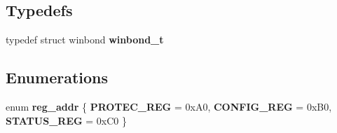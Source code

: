\subsection*{Typedefs}
\begin{DoxyCompactItemize}
\item 
typedef struct winbond \textbf{ winbond\+\_\+t}
\end{DoxyCompactItemize}
\subsection*{Enumerations}
\begin{DoxyCompactItemize}
\item 
enum \textbf{ reg\+\_\+addr} \{ \textbf{ P\+R\+O\+T\+E\+C\+\_\+\+R\+EG} = 0x\+A0, 
\textbf{ C\+O\+N\+F\+I\+G\+\_\+\+R\+EG} = 0x\+B0, 
\textbf{ S\+T\+A\+T\+U\+S\+\_\+\+R\+EG} = 0x\+C0
 \}
\end{DoxyCompactItemize}

